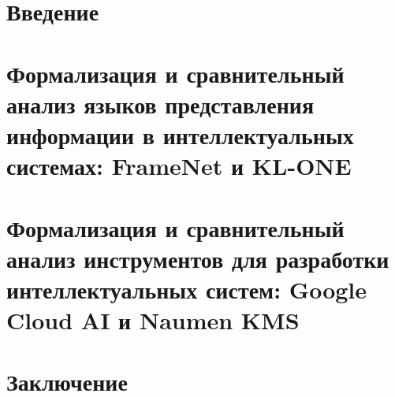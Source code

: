 \section*{Введение}


\newpage
\section{Формализация и сравнительный анализ языков представления информации в интеллектуальных системах: FrameNet и KL-ONE}
%


\newpage
\section{Формализация и сравнительный анализ инструментов для разработки интеллектуальных систем: Google Cloud AI и Naumen KMS}


\newpage
\section*{Заключение}

